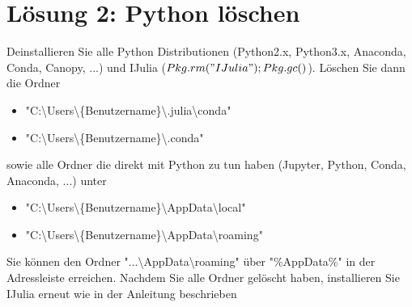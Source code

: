 \documentclass[11pt, a4paper]{scrartcl}
\begin{document}
\newpage
\section{Lösung 2: Python löschen}


Deinstallieren Sie alle Python Distributionen (Python2.x, Python3.x, Anaconda, Conda, Canopy, ...) und IJulia ($Pkg.rm("IJulia"); Pkg.gc()$). Löschen Sie dann die Ordner
\begin{itemize}
	\item "C:\textbackslash Users\textbackslash \{Benutzername\}\textbackslash .julia\textbackslash conda"
	\item "C:\textbackslash Users\textbackslash \{Benutzername\}\textbackslash .conda"
\end{itemize}
sowie alle Ordner die direkt mit Python zu tun haben (Jupyter, Python, Conda, Anaconda, ...) unter 
\begin{itemize}
	\item "C:\textbackslash Users\textbackslash \{Benutzername\}\textbackslash AppData\textbackslash local"
	\item "C:\textbackslash Users\textbackslash \{Benutzername\}\textbackslash AppData\textbackslash roaming"
\end{itemize}
Sie können den Ordner "...\textbackslash AppData\textbackslash roaming" über "\%AppData\%" in der Adressleiste erreichen. Nachdem Sie alle Ordner gelöscht haben, installieren Sie IJulia erneut wie in der Anleitung beschrieben
\end{document}
